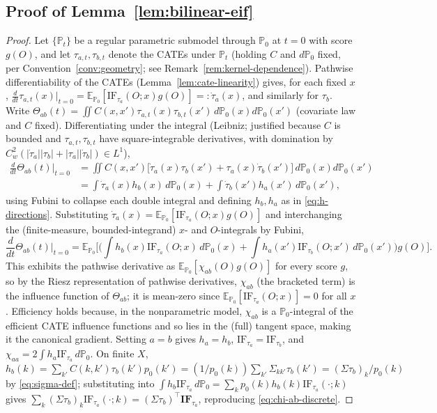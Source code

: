 \documentclass[11pt]{article}
\theoremstyle{plain}
\theoremstyle{definition}
\theoremstyle{remark}
\newcommand{\E}{\mathbb{E}}
\newcommand{\PP}{\mathbb{P}}
\newcommand{\IF}{\mathrm{IF}}
\begin{document}
\subsection{Proof of Lemma~\ref{lem:bilinear-eif}}\label{app:proof-bilinear}

\begin{proof}
Let $\{\PP_t\}$ be a regular parametric submodel through $\PP_0$ at $t=0$ with score
$g(O)$, and let $\tau_{a,t},\tau_{b,t}$ denote the CATEs under $\PP_t$ (holding $C$ and
$d\PP_0$ fixed, per Convention~\ref{conv:geometry}; see
Remark~\ref{rem:kernel-dependence}). Pathwise differentiability of the CATEs
(Lemma~\ref{lem:cate-linearity}) gives, for each fixed $x$,
$\frac{d}{dt}\tau_{a,t}(x)\big|_{t=0}=\E_{\PP_0}[\IF_{\tau_a}(O;x)g(O)]=:\dot\tau_a(x)$,
and similarly for $\tau_b$. Write
$\Theta_{ab}(t)=\iint C(x,x')\tau_{a,t}(x)\tau_{b,t}(x')\,d\PP_0(x)d\PP_0(x')$
(covariate law and $C$ fixed). Differentiating under the integral (Leibniz; justified
because $C$ is bounded and $\tau_{a,t},\tau_{b,t}$ have square-integrable
derivatives, with domination by
$C_w^2(|\dot\tau_a||\tau_b|+|\tau_a||\dot\tau_b|)\in L^1$),
\begin{align*}
    \frac{d}{dt}\Theta_{ab}(t)\Big|_{t=0}
    &= \iint C(x,x')\big[\dot\tau_a(x)\tau_b(x')+\tau_a(x)\dot\tau_b(x')\big]\,d\PP_0(x)d\PP_0(x')\\
    &= \int\dot\tau_a(x)h_b(x)\,d\PP_0(x) + \int\dot\tau_b(x')h_a(x')\,d\PP_0(x'),
\end{align*}
using Fubini to collapse each double integral and defining $h_b,h_a$ as in
\eqref{eq:h-directions}. Substituting $\dot\tau_a(x)=\E_{\PP_0}[\IF_{\tau_a}(O;x)g(O)]$
and interchanging the (finite-measure, bounded-integrand) $x$- and $O$-integrals by
Fubini,
\[
    \frac{d}{dt}\Theta_{ab}(t)\Big|_{t=0}
    = \E_{\PP_0}\!\Big[\Big(\int h_b(x)\IF_{\tau_a}(O;x)\,d\PP_0(x)
        + \int h_a(x')\IF_{\tau_b}(O;x')\,d\PP_0(x')\Big)g(O)\Big].
\]
This exhibits the pathwise derivative as $\E_{\PP_0}[\chi_{ab}(O)g(O)]$ for every
score $g$, so by the Riesz representation of pathwise derivatives, $\chi_{ab}$ (the
bracketed term) is the influence function of $\Theta_{ab}$; it is mean-zero since
$\E_{\PP_0}[\IF_{\tau_a}(O;x)]=0$ for all $x$. Efficiency holds because, in the
nonparametric model, $\chi_{ab}$ is a $\PP_0$-integral of the efficient CATE influence
functions and so lies in the (full) tangent space, making it the canonical gradient.
Setting $a=b$ gives $h_a=h_b$, $\IF_{\tau_a}=\IF_{\tau_b}$, and
$\chi_{aa}=2\int h_a\IF_{\tau_a}\,d\PP_0$. On finite $X$,
$h_b(k)=\sum_{k'}C(k,k')\tau_b(k')p_0(k')=(1/p_0(k))\sum_{k'}\Sigma_{kk'}\tau_b(k')=(\Sigma\tau_b)_k/p_0(k)$
by \eqref{eq:sigma-def}; substituting into $\int h_b\IF_{\tau_a}\,d\PP_0=\sum_kp_0(k)h_b(k)\IF_{\tau_a}(\cdot;k)$
gives $\sum_k(\Sigma\tau_b)_k\IF_{\tau_a}(\cdot;k)=(\Sigma\tau_b)^\top\mathbf{IF}_{\tau_a}$,
reproducing \eqref{eq:chi-ab-discrete}.
\end{proof}
\end{document}
